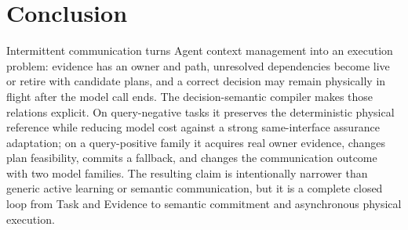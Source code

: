 \documentclass[journal,10pt]{IEEEtran}
\begin{document}
\section{Conclusion}
Intermittent communication turns Agent context management into an execution problem: evidence has
an owner and path, unresolved dependencies become live or retire with candidate plans, and a
correct decision may remain physically in flight after the model call ends. The decision-semantic
compiler makes those relations explicit. On query-negative tasks it preserves the deterministic
physical reference while reducing model cost against a strong same-interface assurance
adaptation; on a query-positive family it acquires real owner evidence, changes plan feasibility,
commits a fallback, and changes the communication outcome with two model families. The resulting
claim is intentionally narrower than generic active learning or semantic communication, but it is
a complete closed loop from Task and Evidence to semantic commitment and asynchronous physical
execution.



\end{document}
